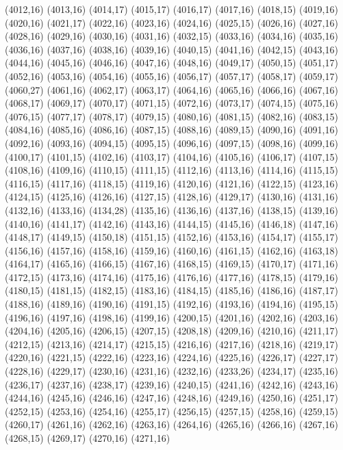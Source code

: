 (4012,16)
(4013,16)
(4014,17)
(4015,17)
(4016,17)
(4017,16)
(4018,15)
(4019,16)
(4020,16)
(4021,17)
(4022,16)
(4023,16)
(4024,16)
(4025,15)
(4026,16)
(4027,16)
(4028,16)
(4029,16)
(4030,16)
(4031,16)
(4032,15)
(4033,16)
(4034,16)
(4035,16)
(4036,16)
(4037,16)
(4038,16)
(4039,16)
(4040,15)
(4041,16)
(4042,15)
(4043,16)
(4044,16)
(4045,16)
(4046,16)
(4047,16)
(4048,16)
(4049,17)
(4050,15)
(4051,17)
(4052,16)
(4053,16)
(4054,16)
(4055,16)
(4056,17)
(4057,17)
(4058,17)
(4059,17)
(4060,27)
(4061,16)
(4062,17)
(4063,17)
(4064,16)
(4065,16)
(4066,16)
(4067,16)
(4068,17)
(4069,17)
(4070,17)
(4071,15)
(4072,16)
(4073,17)
(4074,15)
(4075,16)
(4076,15)
(4077,17)
(4078,17)
(4079,15)
(4080,16)
(4081,15)
(4082,16)
(4083,15)
(4084,16)
(4085,16)
(4086,16)
(4087,15)
(4088,16)
(4089,15)
(4090,16)
(4091,16)
(4092,16)
(4093,16)
(4094,15)
(4095,15)
(4096,16)
(4097,15)
(4098,16)
(4099,16)
(4100,17)
(4101,15)
(4102,16)
(4103,17)
(4104,16)
(4105,16)
(4106,17)
(4107,15)
(4108,16)
(4109,16)
(4110,15)
(4111,15)
(4112,16)
(4113,16)
(4114,16)
(4115,15)
(4116,15)
(4117,16)
(4118,15)
(4119,16)
(4120,16)
(4121,16)
(4122,15)
(4123,16)
(4124,15)
(4125,16)
(4126,16)
(4127,15)
(4128,16)
(4129,17)
(4130,16)
(4131,16)
(4132,16)
(4133,16)
(4134,28)
(4135,16)
(4136,16)
(4137,16)
(4138,15)
(4139,16)
(4140,16)
(4141,17)
(4142,16)
(4143,16)
(4144,15)
(4145,16)
(4146,18)
(4147,16)
(4148,17)
(4149,15)
(4150,18)
(4151,15)
(4152,16)
(4153,16)
(4154,17)
(4155,17)
(4156,16)
(4157,16)
(4158,16)
(4159,16)
(4160,16)
(4161,15)
(4162,16)
(4163,18)
(4164,17)
(4165,16)
(4166,15)
(4167,16)
(4168,15)
(4169,15)
(4170,17)
(4171,16)
(4172,15)
(4173,16)
(4174,16)
(4175,16)
(4176,16)
(4177,16)
(4178,15)
(4179,16)
(4180,15)
(4181,15)
(4182,15)
(4183,16)
(4184,15)
(4185,16)
(4186,16)
(4187,17)
(4188,16)
(4189,16)
(4190,16)
(4191,15)
(4192,16)
(4193,16)
(4194,16)
(4195,15)
(4196,16)
(4197,16)
(4198,16)
(4199,16)
(4200,15)
(4201,16)
(4202,16)
(4203,16)
(4204,16)
(4205,16)
(4206,15)
(4207,15)
(4208,18)
(4209,16)
(4210,16)
(4211,17)
(4212,15)
(4213,16)
(4214,17)
(4215,15)
(4216,16)
(4217,16)
(4218,16)
(4219,17)
(4220,16)
(4221,15)
(4222,16)
(4223,16)
(4224,16)
(4225,16)
(4226,17)
(4227,17)
(4228,16)
(4229,17)
(4230,16)
(4231,16)
(4232,16)
(4233,26)
(4234,17)
(4235,16)
(4236,17)
(4237,16)
(4238,17)
(4239,16)
(4240,15)
(4241,16)
(4242,16)
(4243,16)
(4244,16)
(4245,16)
(4246,16)
(4247,16)
(4248,16)
(4249,16)
(4250,16)
(4251,17)
(4252,15)
(4253,16)
(4254,16)
(4255,17)
(4256,15)
(4257,15)
(4258,16)
(4259,15)
(4260,17)
(4261,16)
(4262,16)
(4263,16)
(4264,16)
(4265,16)
(4266,16)
(4267,16)
(4268,15)
(4269,17)
(4270,16)
(4271,16)
